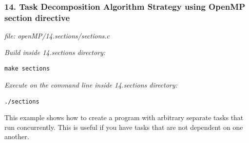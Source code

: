 \documentclass[letterpaper,10pt,openany,oneside]{sphinxmanual}
\begin{document}
\subsubsection{14. Task Decomposition Algorithm Strategy using OpenMP section directive}
\label{SharedMemory/TaskDecomp:task-decomposition-algorithm-strategy-using-openmp-section-directive}
\emph{file: openMP/14.sections/sections.c}

\emph{Build inside 14.sections directory:}

\begin{Verbatim}[commandchars=\\\{\}]
make sections
\end{Verbatim}

\emph{Execute on the command line inside 14.sections directory:}

\begin{Verbatim}[commandchars=\\\{\}]
./sections
\end{Verbatim}

This example shows how to create a program with arbitrary separate tasks that run concurrently.  This is useful if you have tasks that are not dependent on one another.
\end{document}
